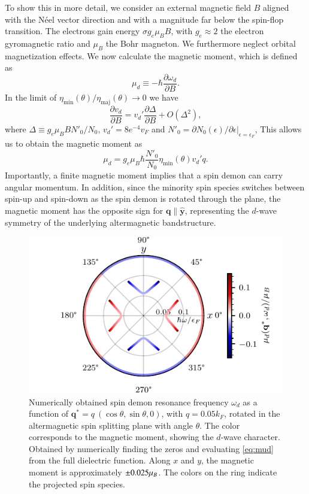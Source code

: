 \documentclass[aps,prl,reprint,twocolumns,superscriptaddress]{revtex4-2}
\newcommand{\deltaq}{\eta_{{\mathrm{min}}}(\theta)/\eta_{{\mathrm{maj}}}(\theta)}
\newcommand{\kF}{k_{F}}
\newcommand{\vs}{v_d}
\begin{document}
	To show this in more detail,  we consider an external magnetic field $B$ aligned with the N\'{e}el vector direction and with a magnitude far below the spin-flop transition. The electrons  gain energy $\sigma g_e\mu_B B$, with $g_e\approx2$ the electron gyromagnetic ratio and $\mu_B$ the Bohr magneton. We furthermore neglect orbital magnetization effects. We now calculate the magnetic moment, which is defined as
	\begin{equation}
		\mu_d \equiv -\hbar\frac{\partial\omega_d}{\partial B}. \label{eq:mud}
	\end{equation}
	In the limit of $\deltaq\rightarrow0$ we have
	\begin{equation}
		\frac{\partial \vs}{\partial B} = \vs' \frac{\partial\Delta}{\partial B} + O(\Delta^2),
	\end{equation}
	where $\Delta\equiv g_e\mu_B B N'_0 /N_0 $, $ \vs'=8e^{-4}v_F$ and $N'_0=\partial N_0(\epsilon)/\partial\epsilon|_{\epsilon=\epsilon_F}$, 
	This allows us to obtain the magnetic moment as
	\begin{equation}
		\mu_d =  g_e\mu_B\hbar \frac{N'_0}{N_0}  \eta_{\mathrm{min}}(\theta)  \vs' q. \label{eq:mup}
	\end{equation}
	Importantly, a finite magnetic moment implies that a spin demon can carry angular momentum. 
	In addition, since the minority spin species switches between spin-up and spin-down as the spin demon is rotated through the plane, the magnetic moment has the opposite sign for $\bm q \parallel \hat{\bm y}$, representing the $d$-wave symmetry of the underlying altermagnetic bandstructure. 
	
	\begin{figure}
		\centering
		\includegraphics[width=0.8\columnwidth]{polar-plot-sign}
		\caption{Numerically obtained spin demon resonance frequency $\omega_d$ as a function of $\bm q^*=q\ (\cos\theta, \sin\theta,0)$, with $q=0.05\kF$, rotated in the altermagnetic spin splitting plane with angle $\theta$. The color corresponds to the magnetic moment, showing the $d$-wave character. Obtained by numerically finding the zeros and evaluating \cref{eq:mud} from the full dielectric function.
			Along $x$ and $y$, the magnetic moment is approximately $\pm0.025\mu_B$. The colors on the ring indicate the projected spin species. \label{fig:magnetic-moment} }
	\end{figure}
	
\end{document}
